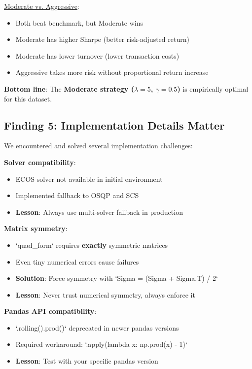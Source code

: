 \documentclass[a4paper,12pt]{article}
\begin{document}
\underline{Moderate vs. Aggressive}:
\begin{itemize}
    \item Both beat benchmark, but Moderate wins
    \item Moderate has higher Sharpe (better risk-adjusted return)
    \item Moderate has lower turnover (lower transaction costs)
    \item Aggressive takes more risk without proportional return increase
\end{itemize}

\textbf{Bottom line}: The \textbf{Moderate strategy ($\lambda=5$, $\gamma=0.5$)} is empirically optimal for this dataset.

\subsection{Finding 5: Implementation Details Matter}

We encountered and solved several implementation challenges:

\textbf{Solver compatibility}:
\begin{itemize}
    \item ECOS solver not available in initial environment
    \item Implemented fallback to OSQP and SCS
    \item \textbf{Lesson}: Always use multi-solver fallback in production
\end{itemize}

\textbf{Matrix symmetry}:
\begin{itemize}
    \item `quad_form` requires \textbf{exactly} symmetric matrices
    \item Even tiny numerical errors cause failures
    \item \textbf{Solution}: Force symmetry with `Sigma = (Sigma + Sigma.T) / 2`
    \item \textbf{Lesson}: Never trust numerical symmetry, always enforce it
\end{itemize}

\textbf{Pandas API compatibility}:
\begin{itemize}
    \item `.rolling().prod()` deprecated in newer pandas versions
    \item Required workaround: `.apply(lambda x: np.prod(x) - 1)`
    \item \textbf{Lesson}: Test with your specific pandas version
\end{itemize}
\end{document}
